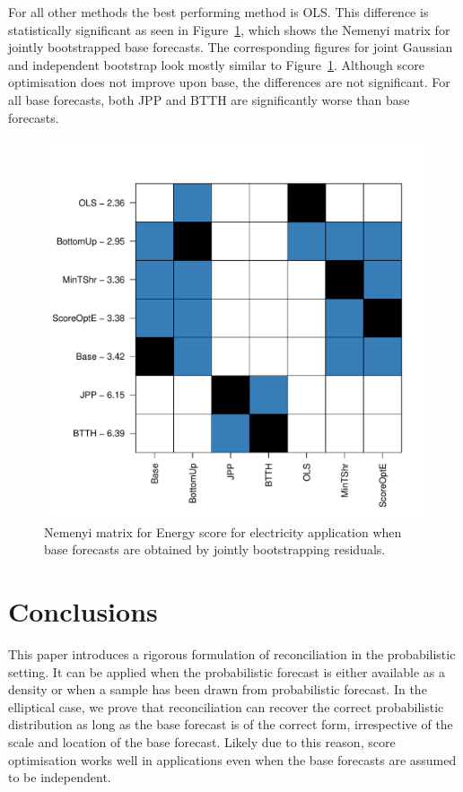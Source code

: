\documentclass[12pt]{article}
\theoremstyle{definition}
\begin{document}
For all other methods the best performing method is OLS.  This difference is statistically significant as seen in Figure~\ref{fig:nem_app_jb}, which shows the Nemenyi matrix for jointly bootstrapped base forecasts. The corresponding figures for joint Gaussian and independent bootstrap look mostly similar to Figure~\ref{fig:nem_app_jb}.  Although score optimisation does not improve upon base, the differences are not significant.  For all base forecasts, both JPP and BTTH are significantly worse than base forecasts.


\begin{figure}
	\centering
	\includegraphics[width=.4\textheight]{Figs/nemenyi_jb.pdf}
	\caption{Nemenyi matrix for Energy score for electricity application when base forecasts are obtained by jointly bootstrapping residuals.}
		\label{fig:nem_app_jb}
\end{figure}	

\section{Conclusions}\label{sec:conclusion}

This paper introduces a rigorous formulation of reconciliation in the probabilistic setting. It can be applied when the probabilistic forecast is either available as a density or when a sample has been drawn from probabilistic forecast.  In the elliptical case, we prove that reconciliation can recover the correct probabilistic distribution as long as the base forecast is of the correct form, irrespective of the scale and location of the base forecast. Likely due to this reason, score optimisation works well in applications even when the base forecasts are assumed to be independent.
\end{document}
